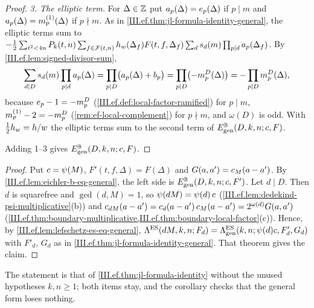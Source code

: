 \begin{proof}
\emph{3. The elliptic term.} For $\Delta\in\mathbb{Z}$ put $a_p(\Delta)=e_p(\Delta)$ if $p\mid m$ and $a_p(\Delta)=m^{(1)}_p(\Delta)$ if $p\nmid m$. As in
\cref{III.ef.thm:jl-formula-identity-general}, the elliptic terms sum to
$-\frac12\sum_{t^2<4n}P_k(t,n)\sum_{f\in\mathcal{F}(t,n)}h_w(\Delta_f)F(t,f,\Delta_f)\sum_ds_d(m)\prod_{p\mid d}a_p(\Delta_f)$. By \cref{III.ef.lem:signed-divisor-sum},
\[
  \sum_{d\mid D}s_d(m)\prod_{p\mid d}a_p(\Delta)=\prod_{p\mid D}\bigl(a_p(\Delta)+b_p\bigr)=\prod_{p\mid D}\bigl(-m^{D}_p(\Delta)\bigr)=-\prod_{p\mid D}m^{D}_p(\Delta),
\]
because $e_p-1=-m^{D}_p$ (\cref{III.ef.def:local-factor-ramified}) for $p\mid m$, $m^{(1)}_p-2=-m^{D}_p$ (\cref{rem:ef-local-complement}) for $p\nmid m$, and
$\omega(D)$ is odd. With $\frac12h_w=h/w$ the elliptic terms sum to the second term of $E^{\mathbb{B}}_{\mathrm{gen}}(D,k,n;c,F)$.

Adding 1--3 gives $E^{\mathbb{B}}_{\mathrm{gen}}(D,k,n;c,F)$.
\end{proof}

\begin{corollary}
\end{corollary}
\begin{proof}
Put $c=\psi(M)$, $F'(t,f,\Delta)=F(\Delta)$ and $G(a,a')=c_M(a-a')$. By \cref{III.ef.lem:eichler-b-eq-general}, the left side is
$E^{\mathbb{B}}_{\mathrm{gen}}(D,k,n;c,F')$. Let $d\mid D$. Then $d$ is squarefree and $\gcd(d,M)=1$, so $\psi(dM)=\psi(d)\,c$
(\cref{III.ef.lem:dedekind-psi-multiplicative}(b)) and $c_{dM}(a-a')=c_d(a-a')\,c_M(a-a')=2^{\omega(d)}G(a,a')$
(\cref{III.ef.thm:boundary-multiplicative,III.ef.thm:boundary-local-factor}(c)). Hence, by \cref{III.ef.lem:lefschetz-es-eq-general},
$\Lambda^{\mathrm{ES}}(dM,k,n;F_d)=\Lambda^{\mathrm{ES}}_{\mathrm{gen}}(k,n;\psi(d)c,F'_d,G_d)$ with $F'_d$, $G_d$ as in \cref{III.ef.thm:jl-formula-identity-general}. That theorem
gives the claim.
\end{proof}
\noindent The statement is that of \cref{III.ef.thm:jl-formula-identity} without the unused hypotheses $k,n\ge1$; both items stay, and the corollary
checks that the general form loses nothing.

